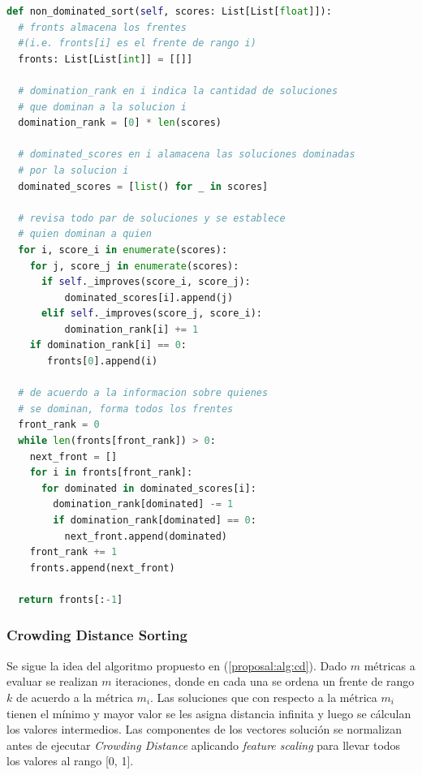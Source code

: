 \begin{lstlisting}[caption=Selecci\'on seg\'un \'indice de dominaci\'on, language=Python]
def non_dominated_sort(self, scores: List[List[float]]):
  # fronts almacena los frentes 
  #(i.e. fronts[i] es el frente de rango i)
  fronts: List[List[int]] = [[]]

  # domination_rank en i indica la cantidad de soluciones
  # que dominan a la solucion i
  domination_rank = [0] * len(scores)

  # dominated_scores en i alamacena las soluciones dominadas
  # por la solucion i
  dominated_scores = [list() for _ in scores]

  # revisa todo par de soluciones y se establece
  # quien dominan a quien
  for i, score_i in enumerate(scores):
    for j, score_j in enumerate(scores):
      if self._improves(score_i, score_j):
          dominated_scores[i].append(j)
      elif self._improves(score_j, score_i):
          domination_rank[i] += 1
    if domination_rank[i] == 0:
       fronts[0].append(i)

  # de acuerdo a la informacion sobre quienes
  # se dominan, forma todos los frentes
  front_rank = 0
  while len(fronts[front_rank]) > 0:
    next_front = []
    for i in fronts[front_rank]:
      for dominated in dominated_scores[i]:
        domination_rank[dominated] -= 1
        if domination_rank[dominated] == 0:
          next_front.append(dominated)
    front_rank += 1
    fronts.append(next_front)

  return fronts[:-1]
\end{lstlisting}

\subsubsection{Crowding Distance Sorting}
Se sigue la idea del algoritmo propuesto en (\ref{proposal:alg:cd}). Dado $m$ m\'etricas a evaluar se realizan $m$ iteraciones, donde en cada una se ordena un frente de rango $k$ de acuerdo a la m\'etrica $m_i$. Las soluciones que con respecto a la m\'etrica $m_i$ tienen el m\'inimo y mayor valor se les asigna distancia infinita y luego se c\'alculan los valores intermedios. Las componentes de los vectores soluci\'on se normalizan antes de ejecutar \textit{Crowding Distance} aplicando \textit{feature scaling} para llevar todos los valores al rango [0, 1].

